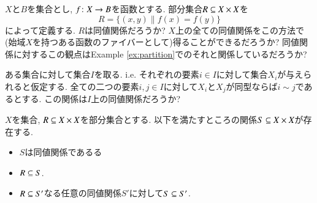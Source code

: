 \begin{exercise}
$X$と$B$を集合とし, $f\taking X\to B$を函数とする. 部分集合$R\ss X\times X$を$$R=\{(x,y)\|f(x)=f(y)\}$$によって定義する.
\sexc $R$は同値関係だろうか? 
\next $X$上の全ての同値関係をこの方法で(始域$X$を持つある函数のファイバーとして)得ることができるだろうか?
\next 同値関係に対するこの観点はExample \ref{ex:partition}でのそれと関係しているだろうか?
\endsexc
\end{exercise}

\begin{exercise}
ある集合に対して集合$I$を取る. i.e. それぞれの要素$i\in I$に対して集合$X_i$が与えられると仮定する. 全ての二つの要素$i,j\in I$に対して$X_i$と$X_j$が同型ならば$i\sim j$であるとする. この関係は$I$上の同値関係だろうか?
\end{exercise}

\begin{lemma}\label{lemma:generating ERs}


$X$を集合, $R\ss X\times X$を部分集合とする. 以下を満たすところの関係$S\ss X\times X$が存在する.
\begin{itemize}
\item $S$は同値関係であるる
\item $R\ss S$.
\item $R\ss S'$なる任意の同値関係$S'$に対して$S\ss S'$.
\end{itemize}

\end{lemma}

